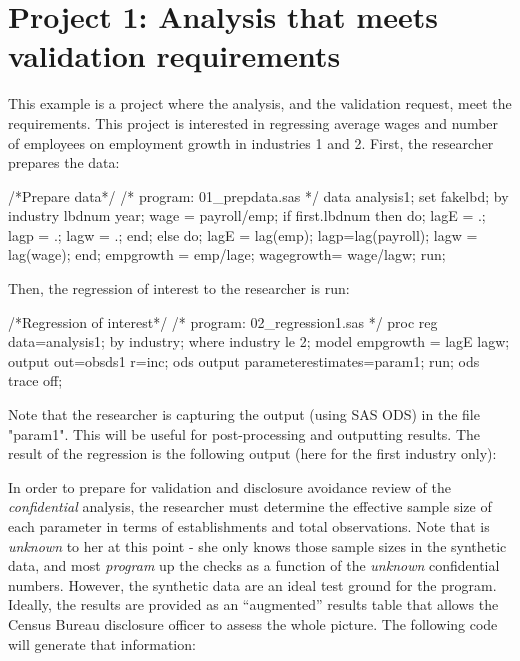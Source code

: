\documentclass{article}
\begin{document}
\section{Project 1:  Analysis that meets validation requirements}
This example is a project where the analysis, and the validation request, meet the requirements. This project is interested in regressing average wages and number of employees 
on employment growth in industries 1 and 2. First, the researcher prepares the data:

\begin{Datastep}
/*Prepare data*/
/* program: 01_prepdata.sas */
data analysis1;
set fakelbd;
by industry lbdnum year;
wage = payroll/emp;
if first.lbdnum then do; 
	lagE = .;         
	lagp = .;         
	lagw = .;         
end;
else                 do; 
	lagE = lag(emp); 
	lagp=lag(payroll); 
	lagw = lag(wage); 
end;
empgrowth = emp/lage;
wagegrowth= wage/lagw;
run;
\end{Datastep}

Then, the regression of interest to the researcher is run:

\begin{Sascode}[store=regA]
/*Regression of interest*/
/* program: 02_regression1.sas */
proc reg data=analysis1;
by industry;
where industry le 2;
model empgrowth = lagE lagw;
output out=obsds1 r=inc;
ods output parameterestimates=param1;
run;
ods trace off;
\end{Sascode}
Note that the researcher is capturing the output (using SAS ODS) in the file "param1". This will be useful for post-processing and outputting results. The result of the regression is the following output (here for the first industry only):


In order to prepare for validation and disclosure avoidance review of the \textit{confidential} analysis, the researcher must determine  the effective sample size of each parameter in terms of establishments and total observations. Note that is \textit{unknown} to her at this point - she only knows those sample sizes in the synthetic data, and most \textit{program} up the checks as a function of the \textit{unknown} confidential numbers. However, the synthetic data are an ideal test ground for the program. 
Ideally, the results are provided as an ``augmented'' results table that allows the Census Bureau disclosure officer to assess the whole picture. The following code will generate that information:
\end{document}
